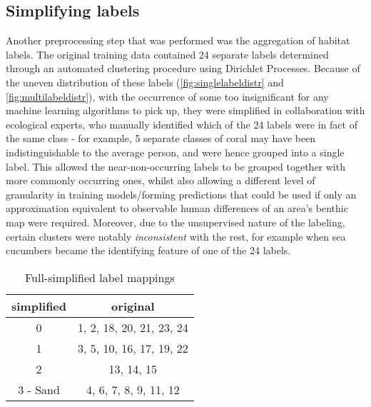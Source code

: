 
\subsection{Simplifying labels}
Another preprocessing step that was performed was the aggregation of habitat labels. The original training data contained 24 separate labels determined through an automated clustering procedure using Dirichlet Processes. Because of the uneven distribution of these labels (\autoref{fig:singlelabeldistr} and \autoref{fig:multilabeldistr}), with the occurrence of some too insignificant for any machine learning algorithms to pick up, they were simplified in collaboration with ecological experts, who manually identified which of the 24 labels were in fact of the same class - for example, 5 separate classes of coral may have been indistinguishable to the average person, and were hence grouped into a single label. This allowed the near-non-occurring labels to be grouped together with more commonly occurring ones, whilst also allowing a different level of granularity in training models/forming predictions that could be used if only an approximation equivalent to observable human differences of an area's benthic map were required. Moreover, due to the unsupervised nature of the labeling, certain clusters were notably \textit{inconsistent} with the rest, for example when sea cucumbers became the identifying feature of one of the 24 labels.

\begin{table}[H]
    \centering
    \begin{tabular}{|c| c|}
        \hline
        simplified & original \\\hline
        0 & 1, 2, 18, 20, 21, 23, 24 \\
        1 & 3, 5, 10, 16, 17, 19, 22\\
        2 & 13, 14, 15 \\
        3 - Sand & 4, 6, 7, 8, 9, 11, 12 \\
        \hline
    \end{tabular}
    \caption{Full-simplified label mappings \tiny{}}
    \label{table:labelmappings}
\end{table}

